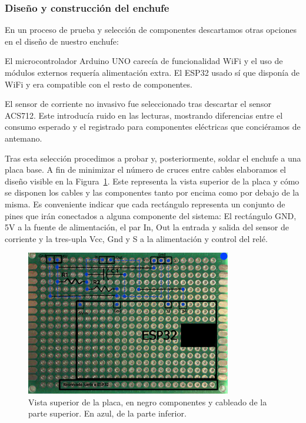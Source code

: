 \documentclass[a4paper,10pt]{article}
\begin{document}
\subsubsection{Diseño y construcción del enchufe}

En un proceso de prueba y selección de componentes descartamos otras
opciones en el diseño de nuestro enchufe:

El microcontrolador Arduino UNO carecía de funcionalidad WiFi y el uso de módulos
externos requería alimentación extra. El ESP32 usado sí que disponía
de WiFi y era compatible con el resto de componentes.

El sensor de corriente no invasivo fue seleccionado tras descartar el
sensor ACS712\cite{ACS712DatasheetPDF}. Este introducía ruido en las
lecturas, mostrando diferencias entre el consumo esperado y el
registrado para componentes eléctricas que conciéramos de antemano.

Tras esta selección procedimos a probar y, posteriormente, soldar el
enchufe a una placa base. A fin de minimizar el número de cruces entre
cables elaboramos el diseño visible en
la Figura~\ref{fig:placa-sup-arriba-abajo}. Este representa la vista superior de
la placa y cómo se disponen los cables y las componentes tanto por
encima como por debajo de la misma. Es conveniente indicar que cada
rectángulo representa un conjunto de pines que irán conectados a
alguna componente del sistema: El rectángulo GND, 5V a la fuente de
alimentación, el par In, Out la entrada y salida del sensor de
corriente y la tres-upla Vcc, Gnd y S a la alimentación y control del
relé.

\begin{figure}
  \centering
  \includegraphics[width=0.8\textwidth]{img/dibujo_placa_vista_superior_arriba_y_abajo.png}
  \caption{Vista superior de la placa, en negro componentes y cableado
  de la parte superior. En azul, de la parte inferior.}\label{fig:placa-sup-arriba-abajo}
\end{figure}
\end{document}
